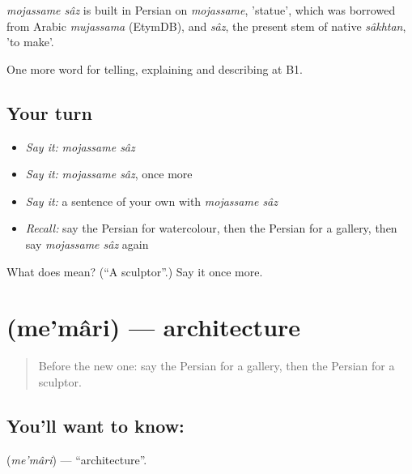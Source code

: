 \begin{cousinweb}
\emph{mojassame sâz} is built in Persian on \emph{mojassame}, 'statue', which was borrowed from Arabic \emph{mujassama} (EtymDB), and \emph{sâz}, the present stem of native \emph{sâkhtan}, 'to make'.
\end{cousinweb}

\begin{grammarlens}[title={What you've built}]
One more word for telling, explaining and describing at B1.
\end{grammarlens}

\subsection*{Your turn}
\begin{itemize}
\raggedright
  \item \emph{Say it:} \emph{mojassame sâz}
  \item \emph{Say it:} \emph{mojassame sâz}, once more
  \item \emph{Say it:} a sentence of your own with \emph{mojassame sâz}
  \item \emph{Recall:} say the Persian for watercolour, then the Persian for a gallery, then say \emph{mojassame sâz} again
\end{itemize}

\begin{tcolorbox}[breakable,colback=teal!4,colframe=teal!35!black,title={Before you move on}]
What does   mean? (\textquotedblleft{}A sculptor\textquotedblright{}.) Say it once more.
\end{tcolorbox}
\section[\texorpdfstring{\fa{معماری} (me'mâri)}{معماری (me'mâri)}]{ (me'mâri) — architecture}

\label{lesson:FA-C526-memari}



\begin{quote}
Before the new one: say the Persian for a gallery, then the Persian for a sculptor.
\end{quote}

\subsection*{You'll want to know: }
\textbf{} (\emph{me'mâri}) — \textquotedblleft{}architecture\textquotedblright{}.

